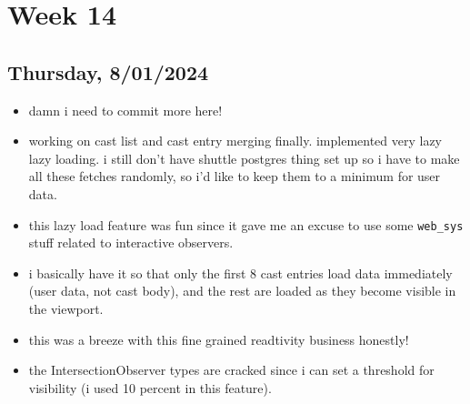 \newpage
\section{Week 14}

\subsection*{Thursday, 8/01/2024}
\begin{itemize}
    \item damn i need to commit more here!
    \item working on cast list and cast entry merging finally. implemented very
        lazy lazy loading. i still don't have shuttle postgres thing set up so i
        have to make all these fetches randomly, so i'd like to keep them to a
        minimum for user data.
    \item this lazy load feature was fun since it gave me an excuse to use some
        \texttt{web_sys} stuff related to interactive observers.
    \item i basically have it so that only the first 8 cast entries load data
        immediately (user data, not cast body), and the rest are loaded as they
        become visible in the viewport.
    \item this was a breeze with this fine grained readtivity business honestly!
    \item the IntersectionObserver types are cracked since i can set a threshold
        for visibility (i used 10 percent in this feature). 
\end{itemize}
